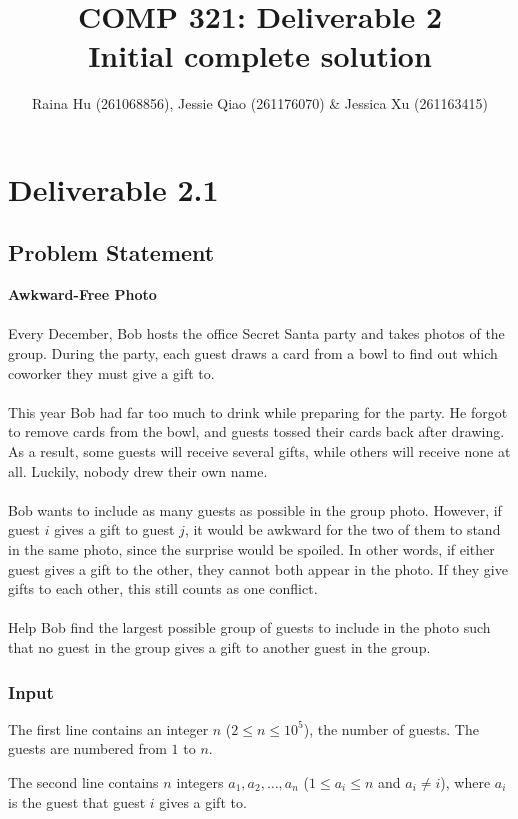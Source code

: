 \documentclass[11pt]{article}
\title{\textbf{COMP 321: Deliverable 2}\\ \Large  Initial complete solution}
\author{Raina Hu (261068856), Jessie Qiao (261176070) \& Jessica Xu (261163415)}
\date{}
\begin{document}
\maketitle

\section*{Deliverable 2.1}

\subsection*{Problem Statement}

\textbf{Awkward-Free Photo}\\\\
Every December, Bob hosts the office Secret Santa party and takes photos of the group. During the party, each guest draws a card from a bowl to find out which coworker they must give a gift to.\\
\\
This year Bob had far too much to drink while preparing for the party. He forgot to remove cards from the bowl, and guests tossed their cards back after drawing. As a result, some guests will receive several gifts, while others will receive none at all. Luckily, nobody drew their own name.\\
\\
Bob wants to include as many guests as possible in the group photo. However, if guest $i$ gives a gift to guest $j$, it would be awkward for the two of them to stand in the same photo, since the surprise would be spoiled. In other words, if either guest gives a gift to the other, they cannot both appear in the photo. If they give gifts to each other, this still counts as one conflict.\\
\\
Help Bob find the largest possible group of guests to include in the photo such that no guest in the group gives a gift to another guest in the group.

\subsubsection*{Input}

The first line contains an integer $n$ ($2 \le n \le 10^5$), the number of guests. The guests are numbered from $1$ to $n$.

The second line contains $n$ integers $a_1, a_2, \dots, a_n$ ($1 \le a_i \le n$ and $a_i \ne i$), where $a_i$ is the guest that guest $i$ gives a gift to.
\end{document}
